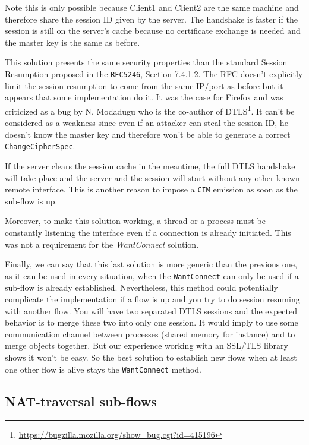 Note this is only possible because Client1 and Client2 are the same machine and therefore share the session ID given by the server. The handshake is faster if the session is still on the server's cache because no certificate exchange is needed and the master key is the same as before.

This solution presents the same security properties than the standard Session Resumption proposed in the \texttt{RFC5246}\cite{rfc5246}, Section 7.4.1.2. The RFC doesn't explicitly limit the session resumption to come from the same IP/port as before but it appears that some implementation do it. It was the case for Firefox and was criticized as a bug by N. Modadugu who is the co-author of DTLS\footnote{\url{https://bugzilla.mozilla.org/show_bug.cgi?id=415196}}. It can't be considered as a weakness since even if an attacker can steal the session ID, he doesn't know the master key and therefore won't be able to generate a correct \texttt{ChangeCipherSpec}.

If the server clears the session cache in the meantime, the full DTLS handshake will take place and the server and the session will start without any other known remote interface. This is another reason to impose a \texttt{CIM} emission as soon as the sub-flow is up.

Moreover, to make this solution working, a thread or a process must be constantly listening the interface even if a connection is already initiated. This was not a requirement for the \textit{WantConnect} solution.

Finally, we can say that this last solution is more generic than the previous one, as it can be used in every situation, when the \texttt{WantConnect} can only be used if a sub-flow is already established. Nevertheless, this method could potentially complicate the implementation if a flow is up and you try to do session resuming with another flow. You will have two separated DTLS sessions and the expected behavior is to merge these two into only one session. It would imply to use some communication channel between processes (shared memory for instance) and to merge objects together. But our experience working with an SSL/TLS library shows it won't be easy. So the best solution to establish new flows when at least one other flow is alive stays the \texttt{WantConnect} method.

\subsection{NAT-traversal sub-flows}

